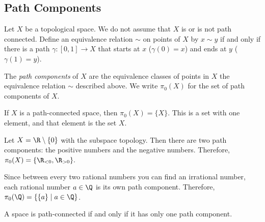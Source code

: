 \documentclass[noname]{notes}
\begin{document}
\subsection{Path Components}

Let $X$ be a topological space. We do not assume that $X$ is or is not path connected. Define an equivalence relation $\sim$ on points of $X$ by $x \sim y$ if and only if there is a path $\gamma \colon [0,1] \to X$ that starts at $x$ ($\gamma(0) = x$) and ends at $y$ ($\gamma(1) = y$). 

\begin{definition}
	The \textit{path components} of $X$ are the equivalence classes of points in $X$ the equivalence relation $\sim$ described above. We write $\pi_0(X)$ for the set of path components of $X$. 
\end{definition}

\begin{example}
	If $X$ is a path-connected space, then $\pi_0(X) = \{X\}$. This is a set with one element, and that element is the set $X$.  
\end{example}

\begin{example}
	Let $X = \R \setminus \{0\}$ with the subspace topology. Then there are two path components: the positive numbers and the negative numbers. Therefore, $\pi_0(X) = \{\R_{<0}, \R_{>0}\}.$
\end{example}

\begin{example}
	Since between every two rational numbers you can find an irrational number, each rational number $a \in \Q$ is its own path component. Therefore, $\pi_0(\Q) = \{\{a\} \mid a \in \Q\}$. 
\end{example}

\begin{remark}
	A space is path-connected if and only if it has only one path component. 
\end{remark}
\end{document}
